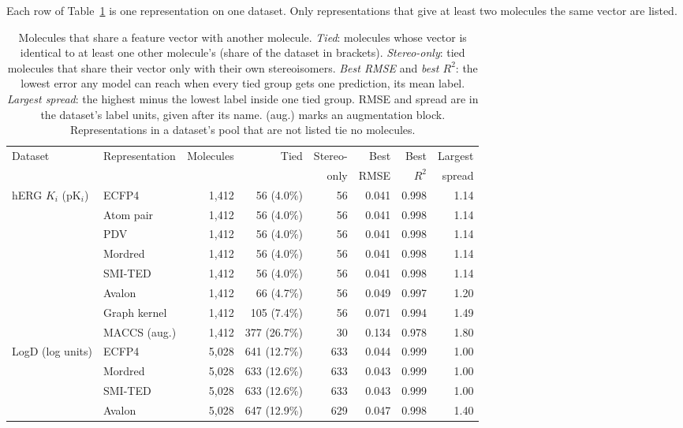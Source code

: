 Each row of Table~\ref{tab:flaws:ties} is one representation on one dataset. Only representations that give at least two molecules the same vector are listed.
\begin{table}[htbp]
\centering
\small
\setlength{\tabcolsep}{4pt}
\caption{Molecules that share a feature vector with another molecule. \emph{Tied}: molecules whose vector is identical to at least one other molecule's (share of the dataset in brackets). \emph{Stereo-only}: tied molecules that share their vector only with their own stereoisomers. \emph{Best RMSE} and \emph{best $R^2$}: the lowest error any model can reach when every tied group gets one prediction, its mean label. \emph{Largest spread}: the highest minus the lowest label inside one tied group. RMSE and spread are in the dataset's label units, given after its name. (aug.) marks an augmentation block. Representations in a dataset's pool that are not listed tie no molecules.}
\label{tab:flaws:ties}
\begin{tabular}{llrrrrrr}
\toprule
Dataset & Representation & Molecules & Tied & Stereo- & Best & Best & Largest \\
 & & & & only & RMSE & $R^2$ & spread \\
\midrule
hERG $K_i$ (pK$_i$) & ECFP4 & 1,412 & 56 (4.0\%) & 56 & 0.041 & 0.998 & 1.14 \\
 & Atom pair & 1,412 & 56 (4.0\%) & 56 & 0.041 & 0.998 & 1.14 \\
 & PDV & 1,412 & 56 (4.0\%) & 56 & 0.041 & 0.998 & 1.14 \\
 & Mordred & 1,412 & 56 (4.0\%) & 56 & 0.041 & 0.998 & 1.14 \\
 & SMI-TED & 1,412 & 56 (4.0\%) & 56 & 0.041 & 0.998 & 1.14 \\
 & Avalon & 1,412 & 66 (4.7\%) & 56 & 0.049 & 0.997 & 1.20 \\
 & Graph kernel & 1,412 & 105 (7.4\%) & 56 & 0.071 & 0.994 & 1.49 \\
 & MACCS (aug.) & 1,412 & 377 (26.7\%) & 30 & 0.134 & 0.978 & 1.80 \\
\midrule
LogD (log units) & ECFP4 & 5,028 & 641 (12.7\%) & 633 & 0.044 & 0.999 & 1.00 \\
 & Mordred & 5,028 & 633 (12.6\%) & 633 & 0.043 & 0.999 & 1.00 \\
 & SMI-TED & 5,028 & 633 (12.6\%) & 633 & 0.043 & 0.999 & 1.00 \\
 & Avalon & 5,028 & 647 (12.9\%) & 629 & 0.047 & 0.998 & 1.40 \\

\end{tabular}
\end{table}

